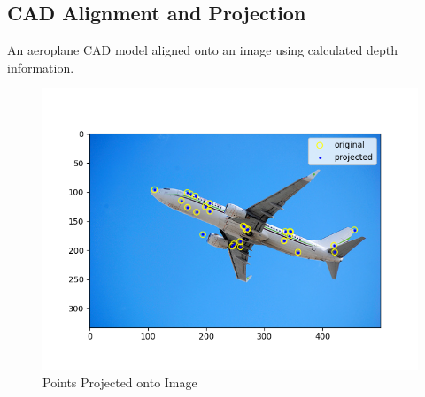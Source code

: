 \newpage
\subsection{CAD Alignment and Projection}

An aeroplane CAD model aligned onto an image
using calculated depth information.


\begin{figure}[H]
  \centering
  \begin{minipage}{\textwidth}
    \centering
    \includegraphics[width=\textwidth]{./figures/03-projected-points-2.png}
    \caption*{Points Projected onto Image}
  \end{minipage}
\end{figure}

